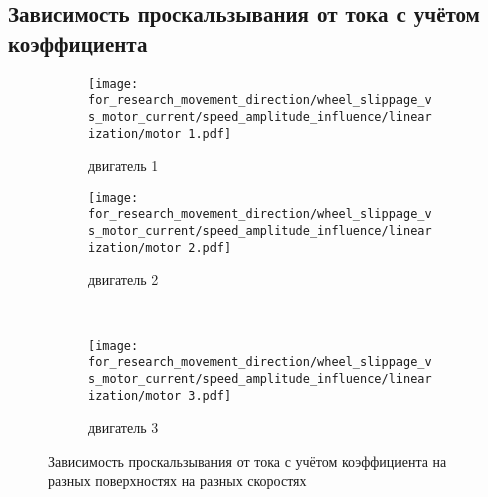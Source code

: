 \subsection{Зависимость проскальзывания от тока с учётом коэффициента}

\begin{figure}[H]
    \centering
    \begin{subfigure}{0.49\textwidth}
        \centering
        \texttt{[image: for\_research\_movement\_direction/wheel\_slippage\_vs\_motor\_current/speed\_amplitude\_influence/linearization/motor 1.pdf]}
        \caption{двигатель 1}
    \end{subfigure}
    \hspace{0.005\textwidth}
    \begin{subfigure}{0.49\textwidth}
        \centering
        \texttt{[image: for\_research\_movement\_direction/wheel\_slippage\_vs\_motor\_current/speed\_amplitude\_influence/linearization/motor 2.pdf]}
        \caption{двигатель 2}
    \end{subfigure} \\
    \vspace{4pt}
    \centering
    \begin{subfigure}{0.49\textwidth}
        \centering
        \texttt{[image: for\_research\_movement\_direction/wheel\_slippage\_vs\_motor\_current/speed\_amplitude\_influence/linearization/motor 3.pdf]}
        \caption{двигатель 3}
    \end{subfigure}
    \caption{Зависимость проскальзывания от тока с учётом коэффициента на разных поверхностях на разных скоростях}
\end{figure}